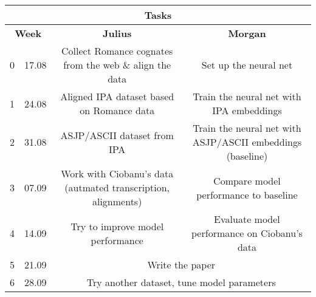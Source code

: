 \documentclass[a4paper, 14pt]{article}
\begin{document}
\begin{landscape}
\begin{tabular}{|l c|c|c|}
    \multicolumn{4}{c}{\textbf{Tasks}} \\
    \hline
    \multicolumn{2}{|c|}{\textbf{Week}} & \textbf{Julius} & \textbf{Morgan} \\
    \hline
    0 & 17.08 & Collect Romance cognates from the web \& align the data & Set up the neural net \\
    1 & 24.08 & Aligned IPA dataset based on Romance data & Train the neural net with IPA embeddings \\
	2 & 31.08 & ASJP/ASCII dataset from IPA & Train the neural net with ASJP/ASCII embeddings (baseline) \\
    3 & 07.09 & Work with Ciobanu's data (autmated transcription, alignments) & Compare model performance to baseline \\
    4 & 14.09 & Try to improve model performance & Evaluate model performance on Ciobanu's data \\
    5 & 21.09 & \multicolumn{2}{|c|}{Write the paper} \\
    6 & 28.09 & \multicolumn{2}{|c|}{Try another dataset, tune model parameters} \\
    \hline
\end{tabular}
\end{landscape}
\end{document}
